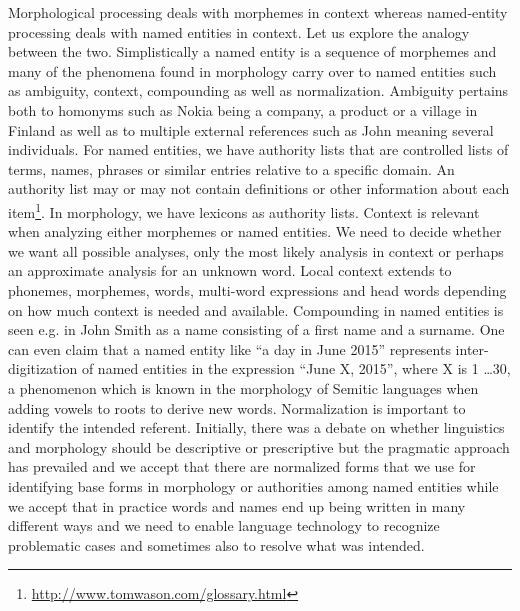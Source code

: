 \documentclass{llncs}
\begin{document}
Morphological processing deals with morphemes in context whereas
named-entity processing deals with named entities in context. Let us
explore the analogy between the two. Simplistically a named entity is
a sequence of morphemes and many of the phenomena found in morphology
carry over to named entities such as ambiguity, context, compounding
as well as normalization. Ambiguity pertains both to homonyms such as
Nokia being a company, a product or a village in Finland as well as to
multiple external references such as John meaning several
individuals. For named entities, we have authority lists that are
controlled lists of terms, names, phrases or similar entries relative
to a specific domain. An authority list may or may not contain
definitions or other information about each
item\footnote{\url{http://www.tomwason.com/glossary.html}}. In
morphology, we have lexicons as authority lists.  Context is relevant
when analyzing either morphemes or named entities. We need to decide
whether we want all possible analyses, only the most likely analysis
in context or perhaps an approximate analysis for an unknown
word. Local context extends to phonemes, morphemes, words, multi-word
expressions and head words depending on how much context is needed and
available. Compounding in named entities is seen e.g. in John Smith as
a name consisting of a first name and a surname. One can even claim
that a named entity like ``a day in June 2015'' represents
inter-digitization of named entities in the expression ``June X,
2015'', where X is 1 \ldots 30, a phenomenon which is known in the
morphology of Semitic languages when adding vowels to roots to derive
new words. Normalization is important to identify the intended
referent. Initially, there was a debate on whether linguistics and
morphology should be descriptive or prescriptive but the pragmatic
approach has prevailed and we accept that there are normalized forms
that we use for identifying base forms in morphology or authorities
among named entities while we accept that in practice words and names
end up being written in many different ways and we need to enable
language technology to recognize problematic cases and sometimes also
to resolve what was intended.
\end{document}
